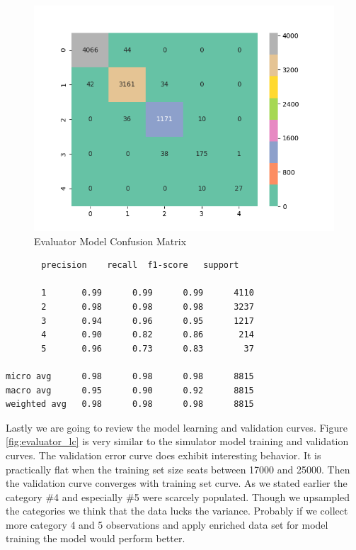 \begin{Schunk}
\begin{figure}[H]

{\centering \includegraphics[width=1\linewidth]{../../models/training/evaluator_rf_tuned_large_matrix} 

}

\caption[Evaluator Model Confusion Matrix]{Evaluator Model Confusion Matrix}\label{fig:evaluator_cm}
\end{figure}
\end{Schunk}

\begin{verbatim}
       precision    recall  f1-score   support

       1       0.99      0.99      0.99      4110
       2       0.98      0.98      0.98      3237
       3       0.94      0.96      0.95      1217
       4       0.90      0.82      0.86       214
       5       0.96      0.73      0.83        37

micro avg      0.98      0.98      0.98      8815
macro avg      0.95      0.90      0.92      8815
weighted avg   0.98      0.98      0.98      8815
\end{verbatim}

Lastly we are going to review the model learning and validation curves.
Figure \ref{fig:evaluator_lc} is very similar to the simulator model
training and validation curves. The validation error curve does exhibit
interesting behavior. It is practically flat when the training set size
seats between 17000 and 25000. Then the validation curve converges with
training set curve. As we stated earlier the category \#4 and especially
\#5 were scarcely populated. Though we upsampled the categories we think
that the data lucks the variance. Probably if we collect more category 4
and 5 observations and apply enriched data set for model training the
model would perform better.

